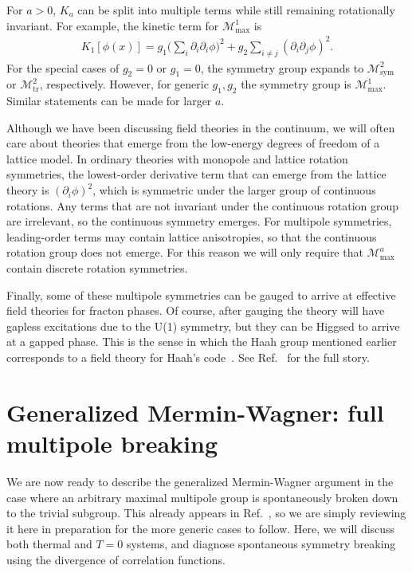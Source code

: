 \documentclass[prb,aps,twocolumn, amsfonts,amsmath,amssymb,nofootinbib,superscriptaddress]{revtex4-2}
\renewcommand{\max}{\text{max}}
\newcommand{\mmax}[1]{\mathcal{M}^{#1}_\max}
\begin{document}
For $a>0$, $K_a$ can be split into multiple terms while still remaining rotationally invariant. For example, the kinetic term for $\mathcal{M}^1_\max$ is 
\begin{align}
K_1[\phi(x)] = g_1 \big(\sum_{i} \partial_i \partial_i \phi\big)^2 + g_2 \sum_{i \ne j} (\partial_i \partial_j \phi)^2.
\end{align}
For the special cases of $g_2=0$ or $g_1=0$, the symmetry group expands to $\mathcal{M}^2_\text{sym}$ or $\mathcal{M}^2_\text{tr}$, respectively. However, for generic $g_1,g_2$ the symmetry group is $\mathcal{M}^1_\max$. Similar statements can be made for larger $a$.

Although we have been discussing field theories in the continuum, we will often care about theories that emerge from the low-energy degrees of freedom of a lattice model. In ordinary theories with monopole and lattice rotation symmetries, the lowest-order derivative term that can emerge from the lattice theory is $(\partial_i \phi)^2$, which is symmetric under the larger group of continuous rotations. Any terms that are not invariant under the continuous rotation group are irrelevant, so the continuous symmetry emerges. For multipole symmetries, leading-order terms may contain lattice anisotropies, so that the continuous rotation group does not emerge. For this reason we will only require that $\mmax{a}$ contain discrete rotation symmetries.

Finally, some of these multipole symmetries can be gauged to arrive at effective field theories for fracton phases. Of course, after gauging the theory will have gapless excitations due to the U(1) symmetry, but they can be Higgsed to arrive at a gapped phase. This is the sense in which the Haah group mentioned earlier corresponds to a field theory for Haah's code~\cite{BB}. See Ref.~\cite{BB, Gromov2019} for the full story. 

\section{Generalized Mermin-Wagner: full multipole breaking}\label{sec:full_breaking}

We are now ready to describe the generalized Mermin-Wagner argument in the case where an arbitrary maximal multipole group is spontaneously broken down to the trivial subgroup. This already appears in Ref.~\cite{Griffin2015}, so we are simply reviewing it here in preparation for the more generic cases to follow. Here, we will discuss both thermal and $T=0$ systems, and diagnose spontaneous symmetry breaking using the divergence of correlation functions.
\end{document}
